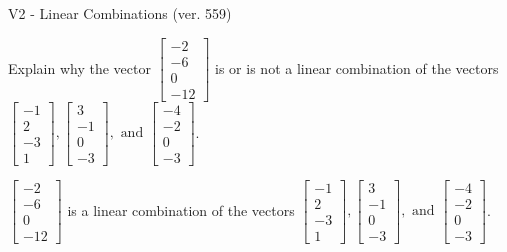 \begin{exercise}
  \begin{exerciseTitle}V2 - Linear Combinations (ver. 559)\end{exerciseTitle}
  \begin{exerciseStatement}
    Explain why the vector \(\left[\begin{array}{c}
-2 \\
-6 \\
0 \\
-12
\end{array}\right]\)  is or is not a linear 
	combination of the vectors \(\left[\begin{array}{c}
-1 \\
2 \\
-3 \\
1
\end{array}\right] , \left[\begin{array}{c}
3 \\
-1 \\
0 \\
-3
\end{array}\right] , \text{ and } \left[\begin{array}{c}
-4 \\
-2 \\
0 \\
-3
\end{array}\right]\).
	


  \end{exerciseStatement}
  \begin{exerciseAnswer}
   \(\left[\begin{array}{c}
-2 \\
-6 \\
0 \\
-12
\end{array}\right]\) 
  	 is  
	a linear combination of the vectors \(\left[\begin{array}{c}
-1 \\
2 \\
-3 \\
1
\end{array}\right] , \left[\begin{array}{c}
3 \\
-1 \\
0 \\
-3
\end{array}\right] , \text{ and } \left[\begin{array}{c}
-4 \\
-2 \\
0 \\
-3
\end{array}\right]\).

	
  


  \end{exerciseAnswer}
\end{exercise}